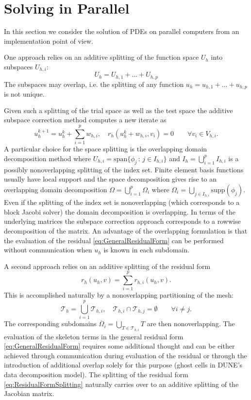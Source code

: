 \documentclass[a4paper,12pt]{article}
\theoremstyle{definition}
\begin{document}
\section{Solving in Parallel}

In this section we consider the solution of PDEs on parallel computers
from an implementation point of view.

One approach relies on an additive splitting of the function space $U_h$
into subspaces $U_{h,i}$:
\begin{equation}
U_h = U_{h,1} + \ldots  + U_{h,p}
\label{eq:SubspaceSplitting}
\end{equation}
The subspaces may overlap, i.e. the splitting of any function $u_h = u_{h,1} + \ldots + u_{h,p}$
is not unique.

Given such a splitting of the trial space as well as the test space the additive subspace
correction method \cite{Xu:1992:IMS:146428.146431} computes a new iterate as
\begin{equation*}
u_h^{k+1} = u_h^k + \sum_{i=1}^p w_{h,i}, \quad r_h(u_h^k+w_{h,i},v_i) = 0 \qquad \forall
v_i\in V_{h,i}.
\end{equation*}
A particular choice for the space splitting is the overlapping domain decomposition
method where $U_{h,i} = \text{span}\{\phi_j\,:\, j\in I_{h,i}\}$ and $I_h = \bigcup_{i=1}^p
I_{h,i}$ is a possibly nonoverlapping splitting of the index set. Finite element basis functions
usually have local support and the space decomposition gives rise to
an overlapping domain decomposition $\Omega = \bigcup_{i=1}^p \Omega_i$ where
$\Omega_i = \bigcup_{j\in I_{h,i}} \text{supp}(\phi_j)$. Even if the splitting of the
index set is nonoverlapping (which corresponds to a block Jacobi solver) the domain
decomposition is overlapping. In terms of the underlying matrices the subspace correction
approach corresponds to a rowwise decomposition of the matrix.
An advantage of the overlapping formulation is that the evaluation of the
residual \eqref{eq:GeneralResidualForm} can be performed without
communication when $u_h$ is known in each subdomain.

A second approach relies on an additive splitting of the residual form
\begin{equation}
r_h(u_h,v) = \sum_{i=1}^p r_{h,i}(u_h,v) .
\label{eq:ResidualFormSplitting}
\end{equation}
This is accomplished naturally by a nonoverlapping partitioning of the mesh:
\begin{equation*}
\mathcal{T}_h = \bigcup_{i=1}^p \mathcal{T}_{h,i}, \quad
\mathcal{T}_{h,i}\cap \mathcal{T}_{h,j} = \emptyset \qquad \forall i\neq j.
\end{equation*}
The corresponding subdomains $\overline{\Omega}_i= \bigcup_{T\in\mathcal{T}_{h,i}} T$
are then nonoverlapping. The evaluation of the skeleton terms
in the general residual form \eqref{eq:GeneralResidualForm} requires some additional thought
and can be either achieved through communication during evaluation of the residual
or through the introduction of additional overlap solely for this purpose (ghost cells
in DUNE's data decomposition model). The splitting of the residual form \eqref{eq:ResidualFormSplitting}
naturally carries over to an additive splitting of the Jacobian matrix.
\end{document}
